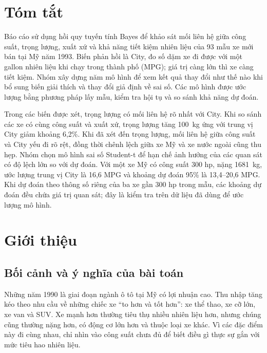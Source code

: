 \documentclass[12pt,a4paper]{report}
\begin{document}
\makereporttitlepage

\chapter*{Tóm tắt}

Báo cáo sử dụng hồi quy tuyến tính Bayes để khảo sát mối liên hệ giữa công
suất, trọng lượng, xuất xứ và khả năng tiết kiệm nhiên liệu của 93 mẫu xe mới
bán tại Mỹ năm 1993. Biến phản hồi là City, đo số dặm xe đi được với một gallon
nhiên liệu khi chạy trong thành phố (MPG); giá trị càng lớn thì xe càng tiết
kiệm. Nhóm xây dựng năm mô hình để xem kết quả thay đổi như thế nào khi bổ sung
biến giải thích và thay đổi giả định về sai số. Các mô hình được ước lượng bằng
phương pháp lấy mẫu, kiểm tra hội tụ và so sánh khả năng dự đoán.

Trong các biến được xét, trọng lượng có mối liên hệ rõ nhất với City. Khi so
sánh các xe có cùng công suất và xuất xứ, trọng lượng tăng \SI{100}{kg} ứng với
trung vị City giảm khoảng 6{,}2\%. Khi đã xét đến trọng lượng, mối liên hệ giữa
công suất và City yếu đi rõ rệt, đồng thời chênh lệch giữa xe Mỹ và xe nước
ngoài cũng thu hẹp. Nhóm chọn mô hình sai số Student-t để hạn chế ảnh hưởng của
các quan sát có độ lệch lớn so với dự đoán. Với một xe Mỹ có công suất 300 hp,
nặng \SI{1681}{kg}, ước lượng trung vị City là 16{,}6 MPG và khoảng dự đoán 95\%
là 13{,}4--20{,}6 MPG. Khi dự đoán theo thông số riêng của ba xe gần 300 hp
trong mẫu, các khoảng dự đoán đều chứa giá trị quan sát; đây là kiểm tra trên
dữ liệu đã dùng để ước lượng mô hình.

\tableofcontents
\pagebreak

\listoffigures
\listoftables
\newpage

\chapter{Giới thiệu}
\label{sec:intro}

\section{Bối cảnh và ý nghĩa của bài toán}

Những năm 1990 là giai đoạn ngành ô tô tại Mỹ có lợi nhuận cao. Thu nhập tăng
kéo theo nhu cầu về những chiếc xe ``to hơn và tốt hơn'': xe thể thao, xe cỡ
lớn, xe van và SUV. Xe mạnh hơn thường tiêu thụ nhiều nhiên liệu hơn, nhưng
chúng cũng thường nặng hơn, có động cơ lớn hơn và thuộc loại xe khác. Vì các
đặc điểm này đi cùng nhau, chỉ nhìn vào công suất chưa đủ để biết điều gì thực
sự gắn với mức tiêu hao nhiên liệu.
\end{document}
